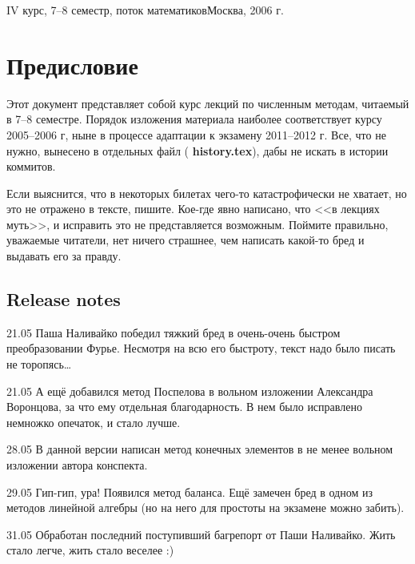 \documentclass[a4paper]{article}
\begin{document}
 {IV курс, 7--8 семестр, поток
  математиков}{Москва, 2006 г.}

\pagebreak
\tableofcontents

\pagebreak

\section*{Предисловие}


Этот документ представляет собой курс лекций по численным методам,
читаемый в 7--8 семестре.  Порядок изложения материала наиболее
соответствует курсу 2005--2006 г, ныне в процессе адаптации к экзамену 
2011--2012 г. Все, что не нужно, вынесено в отдельных файл ( {\bf history.tex}),
дабы не искать в истории коммитов. 

Если выяснится, что в некоторых билетах чего-то катастрофически не
хватает, но это не отражено в тексте, пишите.  Кое-где явно написано,
что <<в лекциях муть>>, и исправить это не представляется возможным.
Поймите правильно, уважаемые читатели, нет ничего страшнее, чем
написать какой-то бред и выдавать его за правду.

\subsection*{Release notes}

\begin{items}{-2}
\item [21.05] Паша Наливайко победил тяжкий бред в очень-очень быстром
  преобразовании Фурье.  Несмотря на всю его быстроту, текст надо было
  писать не торопясь\dots
\item [21.05] А ещё добавился метод Поспелова в вольном изложении
  Александра Воронцова, за что ему отдельная благодарность.  В нем
  было исправлено немножко опечаток, и стало лучше.
\item [28.05] В данной версии написан метод конечных элементов в не
  менее вольном изложении автора конспекта.
\item [29.05] Гип-гип, ура! Появился метод баланса. Ещё замечен бред в
  одном из методов линейной алгебры (но на него для простоты на
  экзамене можно забить).
\item [31.05] Обработан последний поступивший багрепорт от Паши
  Наливайко. Жить стало легче, жить стало веселее :)
\end{items}

\medskip
\end{document}
